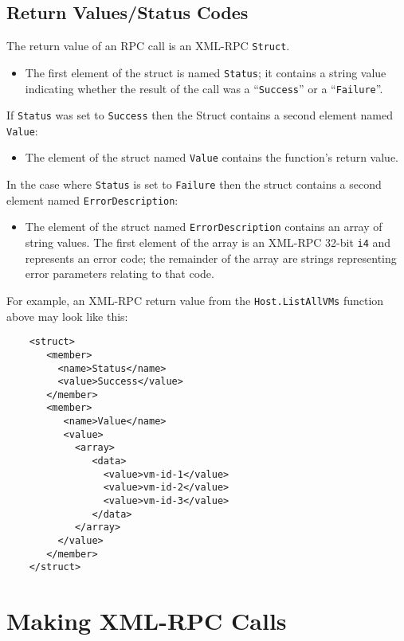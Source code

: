 \subsection{Return Values/Status Codes}
\label{synchronous-result}

The return value of an RPC call is an XML-RPC {\tt Struct}.

\begin{itemize}
\item The first element of the struct is named {\tt Status}; it
contains a string value indicating whether the result of the call was
a ``{\tt Success}'' or a ``{\tt Failure}''.
\end{itemize}

If {\tt Status} was set to {\tt Success} then the Struct contains a second
element named {\tt Value}:
\begin{itemize}
\item The element of the struct named {\tt Value} contains the function's return value.
\end{itemize}

In the case where {\tt Status} is set to {\tt Failure} then
the struct contains a second element named {\tt ErrorDescription}:
\begin{itemize}
\item The element of the struct named {\tt ErrorDescription} contains
an array of string values. The first element of the array is an XML-RPC 32-bit {\tt i4} and represents an error code;
the remainder of the array are strings representing error parameters relating to that code.
\end{itemize}

For example, an XML-RPC return value from the {\tt Host.ListAllVMs} function above
may look like this:
\begin{verbatim}
    <struct>
       <member>
         <name>Status</name>
         <value>Success</value>
       </member>
       <member>
          <name>Value</name>
          <value>
            <array>
               <data>
                 <value>vm-id-1</value>
                 <value>vm-id-2</value>
                 <value>vm-id-3</value>
               </data>
            </array>
         </value>
       </member>
    </struct>
\end{verbatim}

\section{Making XML-RPC Calls}

